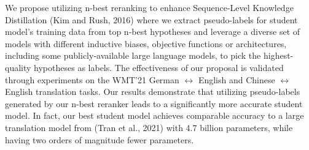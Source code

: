 We propose utilizing n-best reranking to enhance Sequence-Level Knowledge Distillation (Kim and Rush, 2016) where we extract pseudo-labels for student model’s training data from top n-best hypotheses and leverage a diverse set of models with different inductive biases, objective functions or architectures, including some publicly-available large language models, to pick the highest-quality hypotheses as labels. The effectiveness of our proposal is validated through experiments on the WMT’21 German $\leftrightarrow$ English and Chinese $\leftrightarrow$ English translation tasks. Our results demonstrate that utilizing pseudo-labels generated by our n-best reranker leads to a significantly more accurate student model. In fact, our best student model achieves comparable accuracy to a large translation model from (Tran et al., 2021) with 4.7 billion parameters, while having two orders of magnitude fewer parameters.